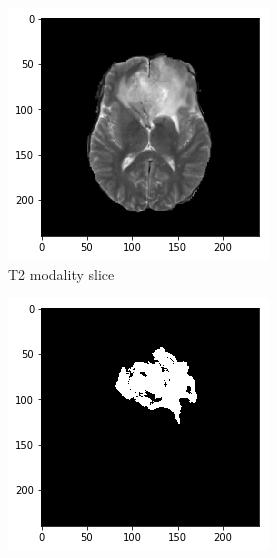 \begin{figure}[H]
    \centering
    \begin{subfigure}[t]{.4\textwidth}
        \centering
        \includegraphics[width=\linewidth]{chapters/06_hdm/c_Brats18_2013_17_1_L1/51.png}
        \caption{T2 modality slice}
    \end{subfigure}\hspace{1cm}%
    \begin{subfigure}[t]{.4\textwidth}
        \centering
        \includegraphics[width=\linewidth]{chapters/06_hdm/c_Brats18_2013_17_1_L1/50.png}

\end{subfigure}
\end{figure}
